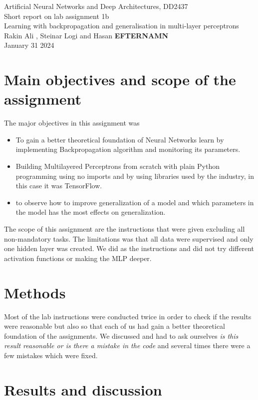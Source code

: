 \documentclass[a4paper]{article}
\begin{document}
\begin{center}
  {\large Artificial Neural Networks and Deep Architectures, DD2437}\\
  \vspace{7mm}
  {\huge Short report on lab assignment 1b\\[1ex]}
  {\Large Learning with backpropagation and generalisation in multi-layer perceptrons\\}
  \vspace{8mm}  
  {\Large Rakin Ali , Steinar Logi and Hasan \textbf{EFTERNAMN}\\}
  \vspace{4mm}
  {\large January 31 2024 }
\end{center}

\section{Main objectives and scope of the assignment}
The major objectives in this assignment was
\begin{itemize}
\item To gain a better theoretical foundation of Neural Networks learn by implementing Backpropagation algorithm and monitoring its parameters. 
\item Building Multilayered Perceptrons from scratch with plain Python programming using no imports and by using libraries used by the industry, in this case it was TensorFlow.
\item to observe how to improve generalization of a model and which parameters in the model has the most effects on generalization. 
\end{itemize}
The scope of this assignment are the instructions that were given excluding all non-mandatory tasks. The limitations was that all data were supervised and only one hidden layer was created. We did as the instructions and did not try different activation functions or making the MLP deeper. 
\section{Methods}
Most of the lab instructions were conducted twice in order to check if the results were reasonable but also so that each of us had gain a better theoretical foundation of the assignments. We discussed and had to ask ourselves \textit{is this result reasonable or is there a mistake in the code} and several times there were a few mistakes which were fixed. 


\section{Results and discussion}
\end{document}
